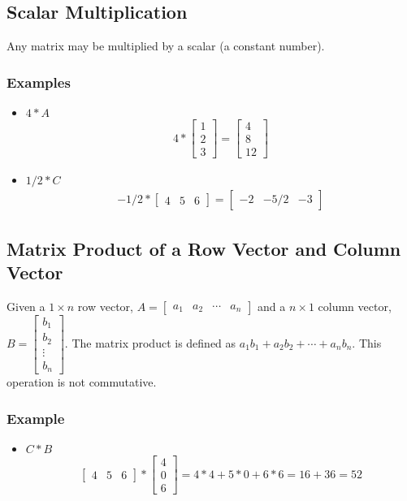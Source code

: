 \documentclass[14pt]{extarticle}
\begin{document}
\subsection{Scalar Multiplication}
Any matrix may be multiplied by a scalar (a constant number).
\subsubsection*{Examples}
\begin{itemize}
	\item $4*A$
	\begin{align*}
		4 * \begin{bmatrix}
			1 \\
			2 \\
			3
		\end{bmatrix} = 
		\begin{bmatrix}
			4 \\
			8 \\
			12
		\end{bmatrix}
	\end{align*}
	\item $1/2*C$
	\begin{align*}
		-1/2 * \begin{bmatrix}
			4 & 5 & 6
		\end{bmatrix} = 
		\begin{bmatrix}
			-2 & -5/2 & -3
		\end{bmatrix}
	\end{align*}
\end{itemize}

\subsection{Matrix Product of a Row Vector and Column Vector}
Given a $1\times n$ row vector, $A=\begin{bmatrix}a_1 & a_2 & \cdots & a_n\end{bmatrix}$ and a $n\times 1$ column vector, $B=\begin{bmatrix}b_1 \\ b_2 \\ \vdots \\ b_n\end{bmatrix}$. The matrix product is defined as $a_1b_1 + a_2b_2 + \cdots + a_nb_n$. This operation is not commutative.
\subsubsection*{Example}
\begin{itemize}
	\item $C * B$
\begin{align*}
	\begin{bmatrix}
		4 & 5 & 6
	\end{bmatrix} *
	\begin{bmatrix}
		4 \\
		0 \\
		6
	\end{bmatrix} =
	4*4 + 5*0 + 6*6 = 16+ 36 = 52
\end{align*}
\end{itemize}
\end{document}
